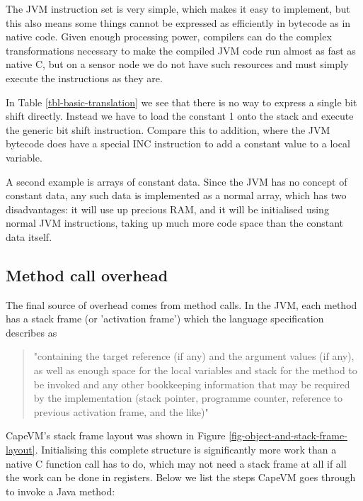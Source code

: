 The JVM instruction set is very simple, which makes it easy to implement, but this also means some things cannot be expressed as efficiently in bytecode as in native code. Given enough processing power, compilers can do the complex transformations necessary to make the compiled JVM code run almost as fast as native C, but on a sensor node we do not have such resources and must simply execute the instructions as they are.

In Table \ref{tbl-basic-translation} we see that there is no way to express a single bit shift directly. Instead we have to load the constant 1 onto the stack and execute the generic bit shift instruction. Compare this to addition, where the JVM bytecode does have a special INC instruction to add a constant value to a local variable.

A second example is arrays of constant data. Since the JVM has no concept of constant data, any such data is implemented as a normal array, which has two disadvantages: it will use up precious RAM, and it will be initialised using normal JVM instructions, taking up much more code space than the constant data itself.

\subsection{Method call overhead}
\label{sec-overhead-method-call}
The final source of overhead comes from method calls. In the JVM, each method has a stack frame (or 'activation frame') which the language specification describes as
\begin{quotation}
"containing the target reference (if any) and the argument values (if any), as well as enough space for the local variables and stack for the method to be invoked and any other bookkeeping information that may be required by the implementation (stack pointer, programme counter, reference to previous activation frame, and the like)" \cite{Gosling:2014}
\end{quotation}

CapeVM's stack frame layout was shown in Figure \ref{fig-object-and-stack-frame-layout}. Initialising this complete structure is significantly more work than a native C function call has to do, which may not need a stack frame at all if all the work can be done in registers. Below we list the steps CapeVM goes through to invoke a Java method:

